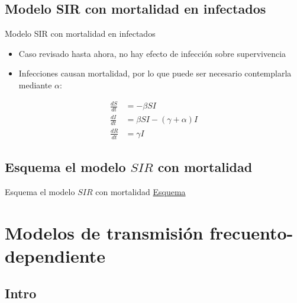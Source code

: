 \documentclass[
  11pt,
  ignorenonframetext,
]{beamer}
\begin{document}
\hypertarget{modelo-sir-con-mortalidad-en-infectados}{%
\subsection{Modelo SIR con mortalidad en
infectados}\label{modelo-sir-con-mortalidad-en-infectados}}

\begin{frame}{Modelo SIR con mortalidad en infectados}
\begin{itemize}
\item
  Caso revisado hasta ahora, no hay efecto de infección sobre
  supervivencia
\item
  Infecciones causan mortalidad, por lo que puede ser necesario
  contemplarla mediante \(\alpha\):
\end{itemize}

\begin{align}
\frac{dS}{dt} &= -\beta SI \\
\frac{dI}{dt} &= \beta SI - (\gamma + \alpha) I \\
\frac{dR}{dt} &= \gamma I
\end{align}
\end{frame}

\hypertarget{esquema-el-modelo-sir-con-mortalidad}{%
\subsection{\texorpdfstring{Esquema el modelo \(SIR\) con
mortalidad}{Esquema el modelo SIR con mortalidad}}\label{esquema-el-modelo-sir-con-mortalidad}}

\begin{frame}{Esquema el modelo \(SIR\) con mortalidad}
\href{Esquemas-SIR.pdf}{Esquema}
\end{frame}

\hypertarget{modelos-de-transmisiuxf3n-frecuento-dependiente}{%
\section{Modelos de transmisión
frecuento-dependiente}\label{modelos-de-transmisiuxf3n-frecuento-dependiente}}

\hypertarget{intro}{%
\subsection{Intro}\label{intro}}
\end{document}
